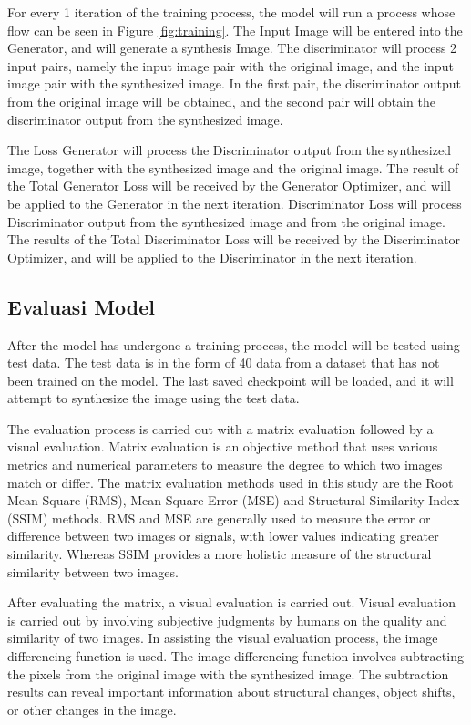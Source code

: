 \documentclass[conference]{IEEEtran}
\begin{document}
For every 1 iteration of the training process, the model will run a process whose flow can be seen in Figure \ref{fig:training}.
The Input Image will be entered into the Generator, and will generate a synthesis Image.
The discriminator will process 2 input pairs, namely the input image pair with the original image, and the input image pair with the synthesized image.
In the first pair, the discriminator output from the original image will be obtained, and the second pair will obtain the discriminator output from the synthesized image.

The Loss Generator will process the Discriminator output from the synthesized image, together with the synthesized image and the original image.
The result of the Total Generator Loss will be received by the Generator Optimizer, and will be applied to the Generator in the next iteration.
Discriminator Loss will process Discriminator output from the synthesized image and from the original image.
The results of the Total Discriminator Loss will be received by the Discriminator Optimizer, and will be applied to the Discriminator in the next iteration.

\subsection{Evaluasi Model}
After the model has undergone a training process, the model will be tested using test data. 
The test data is in the form of 40 data from a dataset that has not been trained on the model. 
The last saved checkpoint will be loaded, and it will attempt to synthesize the image using the test data.

The evaluation process is carried out with a matrix evaluation followed by a visual evaluation. 
Matrix evaluation is an objective method that uses various metrics and numerical parameters to measure the degree to which two images match or differ. 
The matrix evaluation methods used in this study are the Root Mean Square (RMS), Mean Square Error (MSE) and Structural Similarity Index (SSIM) methods. 
RMS and MSE are generally used to measure the error or difference between two images or signals, with lower values indicating greater similarity. 
Whereas SSIM provides a more holistic measure of the structural similarity between two images.

After evaluating the matrix, a visual evaluation is carried out. 
Visual evaluation is carried out by involving subjective judgments by humans on the quality and similarity of two images. 
In assisting the visual evaluation process, the image differencing function is used. 
The image differencing function involves subtracting the pixels from the original image with the synthesized image. 
The subtraction results can reveal important information about structural changes, object shifts, or other changes in the image.
\end{document}
